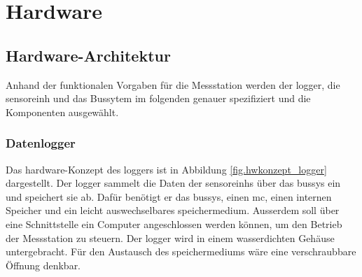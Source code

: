 %
%

\chapter{Hardware}\label{chap.hardware}


\section{Hardware-Architektur}\label{sec.hw_arch}

Anhand der funktionalen Vorgaben für die Messstation werden der \gls{logger}, die \gls{sensoreinh} und das Bussytem im folgenden genauer spezifiziert und die Komponenten ausgewählt.

\subsection{Datenlogger}
Das \gls{hardware}-Konzept des \gls{logger}s ist in Abbildung \ref{fig.hwkonzept_logger} dargestellt.
Der \gls{logger} sammelt die Daten der \glspl{sensoreinh} über das \gls{bussys} ein und speichert sie ab. Dafür benötigt er das \gls{bussys}, einen \gls{mc}, einen internen Speicher und ein leicht auswechselbares \gls{speichermedium}. Ausserdem soll über eine Schnittstelle ein Computer angeschlossen werden können, um den Betrieb der Messstation zu steuern. Der \gls{logger} wird in einem wasserdichten Gehäuse untergebracht. Für den Austausch des \gls{speichermedium}s wäre eine verschraubbare Öffnung denkbar.

